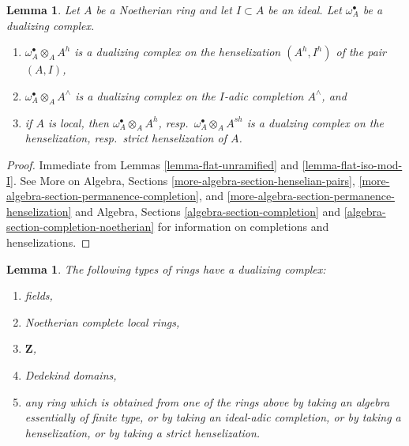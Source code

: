 \documentclass{stacks-project}
\theoremstyle{plain}
\newtheorem{lemma}[subsection]{Lemma}
\theoremstyle{definition}
\theoremstyle{remark}
\numberwithin{equation}{subsection}
\begin{document}
\begin{lemma}
\label{lemma-completion-henselization-dualizing}
Let $A$ be a Noetherian ring and let $I \subset A$ be an ideal.
Let $\omega_A^\bullet$ be a dualizing complex.
\begin{enumerate}
\item $\omega_A^\bullet \otimes_A A^h$ is a dualizing complex on the
henselization $(A^h, I^h)$ of the pair $(A, I)$,
\item $\omega_A^\bullet \otimes_A A^\wedge$ is a dualizing complex on
the $I$-adic completion $A^\wedge$, and
\item if $A$ is local, then $\omega_A^\bullet \otimes_A A^h$,
resp.\ $\omega_A^\bullet \otimes_A A^{sh}$ is a dualzing complex
on the henselization, resp.\ strict henselization of $A$.
\end{enumerate}
\end{lemma}

\begin{proof}
Immediate from Lemmas \ref{lemma-flat-unramified} and
\ref{lemma-flat-iso-mod-I}.
See More on Algebra, Sections \ref{more-algebra-section-henselian-pairs},
\ref{more-algebra-section-permanence-completion}, and
\ref{more-algebra-section-permanence-henselization} and
Algebra, Sections \ref{algebra-section-completion} and
\ref{algebra-section-completion-noetherian}
for information on completions and henselizations.
\end{proof}

\begin{lemma}
\label{lemma-ubiquity-dualizing}
The following types of rings have a dualizing complex:
\begin{enumerate}
\item fields,
\item Noetherian complete local rings,
\item $\mathbf{Z}$,
\item Dedekind domains,
\item any ring which is obtained from one of the rings above by
taking an algebra essentially of finite type, or by taking an
ideal-adic completion, or by taking a henselization, 
or by taking a strict henselization.
\end{enumerate}
\end{lemma}
\end{document}
